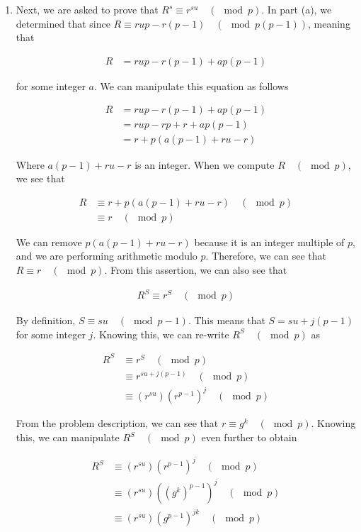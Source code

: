 \documentclass[11pt]{article}
\theoremstyle{definition}
\newcounter{problem}
\begin{document}
\begin{enumerate}
\begin{enumerate}
\item %

Next, we are asked to prove that $R^s \equiv r^{su} \quad (\mod{p})$. In part (a), we determined that since $R \equiv rup - r(p-1) \quad (\mod{p(p-1)})$, meaning that

\begin{align*}
    R &= rup - r(p - 1) + ap(p-1)
\end{align*}

for some integer $a$. We can manipulate this equation as follows

\begin{align*}
    R &= rup - r(p - 1) + ap(p - 1) \\
    &= rup - rp + r + ap(p - 1) \\
    &= r + p(a(p-1) + ru - r)
\end{align*}

Where $a(p-1) + ru - r$ is an integer. When we compute $R \quad (\mod{p})$, we see that

\begin{align*}
    R &\equiv r + p(a(p - 1) + ru - r) \quad (\mod{p}) \\
    &\equiv r \quad (\mod{p})
\end{align*}

We can remove $p(a(p - 1) + ru - r)$ because it is an integer multiple of $p$, and we are performing arithmetic modulo $p$. Therefore, we can see that $R \equiv r \quad (\mod{p})$. From this assertion, we can also see that

\begin{align*}
    R^S \equiv r^S \quad (\mod{p})
\end{align*}

By definition, $S \equiv su \quad (\mod{p - 1})$. This means that $S = su + j(p - 1)$ for some integer $j$. Knowing this, we can re-write $R^S \quad (\mod{p})$ as

\begin{align*}
    R^S &\equiv r^S \quad (\mod{p}) \\ 
    &\equiv r^{su + j(p - 1)} \quad (\mod{p}) \\
    &\equiv (r^{su}) (r^{p - 1})^j \quad (\mod{p})
\end{align*}

From the problem description, we can see that $r \equiv g^k \quad (\mod{p})$. Knowing this, we can manipulate $R^S \quad (\mod{p})$ even further to obtain

\begin{align*}
    R^S &\equiv (r^{su}) (r^{p - 1})^j \quad (\mod{p}) \\
    &\equiv (r^{su}) ((g^k)^{p - 1})^j \quad (\mod{p}) \\
    &\equiv (r^{su}) (g^{p - 1})^{jk} \quad (\mod{p})
\end{align*}


\end{enumerate}
\end{enumerate}
\end{document}
